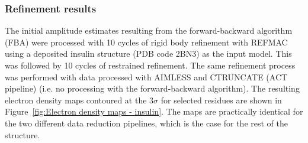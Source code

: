 \subsubsection{Refinement results}
\label{subs:Refinement results - insulin}
The initial amplitude estimates resulting from the forward-backward algorithm (FBA) were processed with 10 cycles of rigid body refinement with REFMAC \cite{murshudov2011refmac5} using a deposited insulin structure (PDB code 2BN3) as the input model.
This was followed by 10 cycles of restrained refinement.
The same refinement process was performed with data processed with AIMLESS \cite{evans2013} and CTRUNCATE (ACT pipeline)\cite{winn2011} (i.e. no processing with the forward-backward algorithm).
The resulting electron density maps contoured at the 3$\sigma$ for selected residues are shown in Figure~\ref{fig:Electron density maps - insulin}.
The maps are practically identical for the two different data reduction pipelines, which is the case for the rest of the structure.
